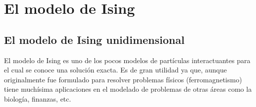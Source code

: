 \documentclass[letterpaper,12pt,oneside]{book}
\begin{document}
\tableofcontents


\newpage


\chapter{El modelo de Ising}
\section{El modelo de Ising unidimensional}
%
El modelo de Ising es uno de los pocos modelos de part\'iculas interactuantes para el cual se conoce una soluci\'on exacta. Es de gran utilidad ya que, aunque originalmente fue formulado para resolver problemas f\'isicos (ferromagnetismo) tiene much\'isima aplicaciones en el modelado de problemas de otras \'areas como la biolog\'ia, finanzas, etc.\\
\end{document}
